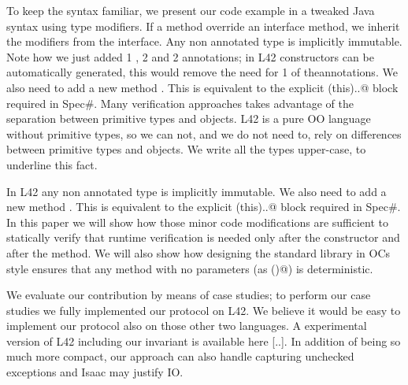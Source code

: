 
To keep the syntax familiar, we present our code example in a tweaked Java syntax using type modifiers.
If a method override an interface method, we inherit the modifiers from the interface.
Any non annotated type is implicitly immutable.
Note how we just added 1 \Q@read@, 2 \Q@mut@ and 2 \Q@capsule@ annotations; in L42 constructors can be automatically generated, this would remove the need for 1 of the\Q@capsule@ annotations.
We also need to add a new method \Q@moveTo@. This is equivalent to the explicit \Q@expose(this){..}@
block required in Spec\#.
Many verification approaches takes advantage of the separation between primitive types and objects.
L42 is a pure OO language without primitive types, so we can not, and we do not need to, rely
on differences between primitive types and objects.
We write all the types upper-case, to underline this fact.


In L42 any non annotated type is implicitly immutable.
We also need to add a new method \Q@moveTo@. This is equivalent to the explicit \Q@expose(this){..}@
block required in Spec\#.
In this paper we will show how those minor code modifications are sufficient
to statically verify that runtime verification is needed only
after the constructor and after the \Q@moveTo@ method.
We will also show how designing the standard library in OCs style
ensures that any \Q@read@ method with no parameters (as \Q@invariant()@) is
deterministic.

We evaluate our contribution by means of case studies;
to perform our case studies we fully implemented our protocol on L42.
We believe it would be easy to implement our protocol also on those other two languages.
A experimental version of L42 including our invariant is available here [..].
In addition of being so much more compact, our approach can also handle capturing unchecked exceptions
and Isaac may justify IO.


